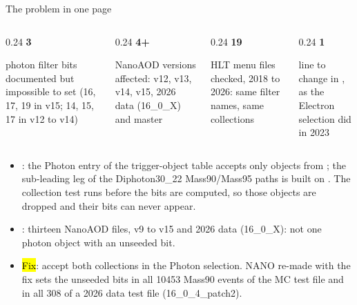 \begin{frame}{The problem in one page}
  \begin{columns}[T]
    \begin{column}{0.24\linewidth}\centering
      {\Huge\bfseries\color{cmsgold}3}\par\vspace{2pt}
      {\scriptsize photon filter bits documented but impossible to set (16, 17, 19 in v15; 14, 15, 17 in v12 to v14)}
    \end{column}
    \begin{column}{0.24\linewidth}\centering
      {\Huge\bfseries\color{cmsgold}4+}\par\vspace{2pt}
      {\scriptsize NanoAOD versions affected: v12, v13, v14, v15, 2026 data (16\_0\_X) and master}
    \end{column}
    \begin{column}{0.24\linewidth}\centering
      {\Huge\bfseries\color{cmsaccent}19}\par\vspace{2pt}
      {\scriptsize HLT menu files checked, 2018 to 2026: same filter names, same collections}
    \end{column}
    \begin{column}{0.24\linewidth}\centering
      {\Huge\bfseries\color{cmsaccent}1}\par\vspace{2pt}
      {\scriptsize line to change in , as the Electron selection did in 2023}
    \end{column}
  \end{columns}
  \par\vspace{8pt}
  \begin{itemize}\small
    \item {}: the Photon entry of the trigger-object table accepts only objects from
          ; the sub-leading leg of the Diphoton30\_22 Mass90/Mass95 paths is built on
          . The collection test runs before the bits are computed, so those
          objects are dropped and their bits can never appear.
    \item {}: thirteen NanoAOD files, v9 to v15 and 2026 data (16\_0\_X): not one photon object with an unseeded bit.
    \item \hl{Fix}: accept both collections in the Photon selection. NANO re-made with the fix sets the unseeded
          bits in all 10453 Mass90 events of the MC test file and in all 308 of a 2026 data test file (16\_0\_4\_patch2).
  \end{itemize}
\end{frame}

